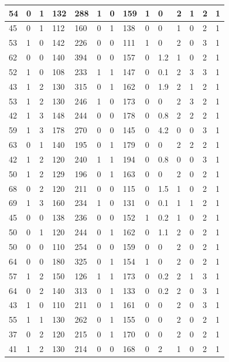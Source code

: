 \documentclass{article}
\begin{document}
\begin{table}[h!]
\begin{tabular}{|l|l|l|l|l|l|l|l|l|l|l|l|l|l|}
54 & 0 & 1 & 132 & 288 & 1 & 0 & 159 & 1 & 0 & 2  &1 & 2 & 1 \\ \hline
45 & 0 & 1 & 112 & 160 & 0 & 1 & 138 & 0 & 0 & 1  &0 & 2 & 1 \\ \hline
53 & 1 & 0 & 142 & 226 & 0 & 0 & 111 & 1 & 0 & 2  &0 & 3 & 1 \\ \hline
62 & 0 & 0 & 140 & 394 & 0 & 0 & 157 & 0 & 1.2 & 1  &0 & 2 & 1 \\ \hline
52 & 1 & 0 & 108 & 233 & 1 & 1 & 147 & 0 & 0.1 & 2  &3 & 3 & 1 \\ \hline
43 & 1 & 2 & 130 & 315 & 0 & 1 & 162 & 0 & 1.9 & 2  &1 & 2 & 1 \\ \hline
53 & 1 & 2 & 130 & 246 & 1 & 0 & 173 & 0 & 0 & 2  &3 & 2 & 1 \\ \hline
42 & 1 & 3 & 148 & 244 & 0 & 0 & 178 & 0 & 0.8 & 2  &2 & 2 & 1 \\ \hline
59 & 1 & 3 & 178 & 270 & 0 & 0 & 145 & 0 & 4.2 & 0  &0 & 3 & 1 \\ \hline
63 & 0 & 1 & 140 & 195 & 0 & 1 & 179 & 0 & 0 & 2  &2 & 2 & 1 \\ \hline
42 & 1 & 2 & 120 & 240 & 1 & 1 & 194 & 0 & 0.8 & 0  &0 & 3 & 1 \\ \hline
50 & 1 & 2 & 129 & 196 & 0 & 1 & 163 & 0 & 0 & 2  &0 & 2 & 1 \\ \hline
68 & 0 & 2 & 120 & 211 & 0 & 0 & 115 & 0 & 1.5 & 1  &0 & 2 & 1 \\ \hline
69 & 1 & 3 & 160 & 234 & 1 & 0 & 131 & 0 & 0.1 & 1  &1 & 2 & 1 \\ \hline
45 & 0 & 0 & 138 & 236 & 0 & 0 & 152 & 1 & 0.2 & 1  &0 & 2 & 1 \\ \hline
50 & 0 & 1 & 120 & 244 & 0 & 1 & 162 & 0 & 1.1 & 2  &0 & 2 & 1 \\ \hline
50 & 0 & 0 & 110 & 254 & 0 & 0 & 159 & 0 & 0 & 2  &0 & 2 & 1 \\ \hline
64 & 0 & 0 & 180 & 325 & 0 & 1 & 154 & 1 & 0 & 2  &0 & 2 & 1 \\ \hline
57 & 1 & 2 & 150 & 126 & 1 & 1 & 173 & 0 & 0.2 & 2  &1 & 3 & 1 \\ \hline
64 & 0 & 2 & 140 & 313 & 0 & 1 & 133 & 0 & 0.2 & 2  &0 & 3 & 1 \\ \hline
43 & 1 & 0 & 110 & 211 & 0 & 1 & 161 & 0 & 0 & 2  &0 & 3 & 1 \\ \hline
55 & 1 & 1 & 130 & 262 & 0 & 1 & 155 & 0 & 0 & 2  &0 & 2 & 1 \\ \hline
37 & 0 & 2 & 120 & 215 & 0 & 1 & 170 & 0 & 0 & 2  &0 & 2 & 1 \\ \hline
41 & 1 & 2 & 130 & 214 & 0 & 0 & 168 & 0 & 2 & 1  &0 & 2 & 1 \\ \hline

\end{tabular}
\end{table}
\end{document}
